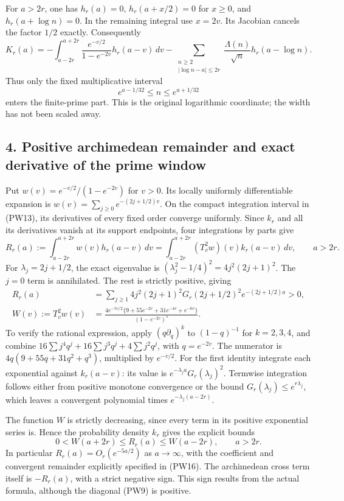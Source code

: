 \documentclass[
  10pt,
  a4paper,
]{article}
\begin{document}
For \(a>2r\), one has \(h_r(a)=0\), \(h_r(a+x/2)=0\) for \(x\ge0\), and
\(h_r(a+\log n)=0\). In the remaining integral use \(x=2v\). Its
Jacobian cancels the factor \(1/2\) exactly. Consequently \[
\boxed{
 K_r(a)=-\int_{a-2r}^{a+2r}
       \frac{e^{-v/2}}{1-e^{-2v}}h_r(a-v)\,dv
       -\sum_{\substack{n\ge2\\|\log n-a|\le2r}}
        \frac{\Lambda(n)}{\sqrt n}h_r(a-\log n).}
\tag{PW13}
\] Thus only the fixed multiplicative interval \[
 e^{a-1/32}\le n\le e^{a+1/32}
\tag{PW14}
\] enters the finite-prime part. This is the original logarithmic
coordinate; the width has not been scaled away.

\subsection{4. Positive archimedean remainder and exact derivative of
the prime
window}\label{positive-archimedean-remainder-and-exact-derivative-of-the-prime-window}

Put \(w(v)=e^{-v/2}/(1-e^{-2v})\) for \(v>0\). Its locally uniformly
differentiable expansion is \(w(v)=\sum_{j\ge0}e^{-(2j+1/2)v}\). On the
compact integration interval in (PW13), its derivatives of every fixed
order converge uniformly. Since \(k_r\) and all its derivatives vanish
at its support endpoints, four integrations by parts give \[
 R_r(a):=\int_{a-2r}^{a+2r}w(v)h_r(a-v)\,dv
 =\int_{a-2r}^{a+2r}(T_v^2w)(v)k_r(a-v)\,dv,
 \qquad a>2r.
\tag{PW15}
\] For \(\lambda_j=2j+1/2\), the exact eigenvalue is
\((\lambda_j^2-1/4)^2=4j^2(2j+1)^2\). The \(j=0\) term is annihilated.
The rest is strictly positive, giving \[
\begin{split}
 R_r(a)&=\sum_{j\ge1}4j^2(2j+1)^2G_r(2j+1/2)^2e^{-(2j+1/2)a}>0,\\
 W(v):=T_v^2w(v)
 &=\frac{4e^{-5v/2}\{9+55e^{-2v}+31e^{-4v}+e^{-6v}\}}
         {(1-e^{-2v})^5}.
\end{split}
\tag{PW16}
\] To verify the rational expression, apply \((q\partial_q)^k\) to
\((1-q)^{-1}\) for \(k=2,3,4\), and combine
\(16\sum j^4q^j+16\sum j^3q^j+4\sum j^2q^j\), with \(q=e^{-2v}\). The
numerator is \(4q(9+55q+31q^2+q^3)\), multiplied by \(e^{-v/2}\). For
the first identity integrate each exponential against \(k_r(a-v)\): its
value is \(e^{-\lambda_j a}G_r(\lambda_j)^2\). Termwise integration
follows either from positive monotone convergence or the bound
\(G_r(\lambda_j)\le e^{r\lambda_j}\), which leaves a convergent
polynomial times \(e^{-\lambda_j(a-2r)}\).

The function \(W\) is strictly decreasing, since every term in its
positive exponential series is. Hence the probability density \(k_r\)
gives the explicit bounds \[
 0<W(a+2r)\le R_r(a)\le W(a-2r),\qquad a>2r.
\tag{PW17}
\] In particular \(R_r(a)=O_r(e^{-5a/2})\) as \(a\to\infty\), with the
coefficient and convergent remainder explicitly specified in (PW16). The
archimedean cross term itself is \(-R_r(a)\), with a strict negative
sign. This sign results from the actual formula, although the diagonal
(PW9) is positive.
\end{document}
